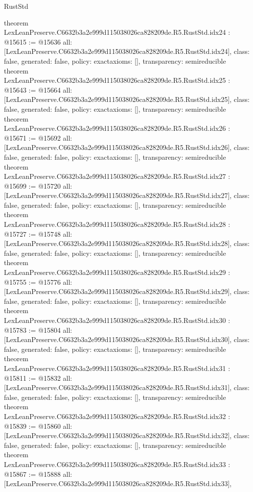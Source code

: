 \begin{lexlean}{RustStd}
\begin{coremodule}
{}
theorem LexLeanPreserve.C6632b3a2e999d115038026ca828209de.R5.RustStd.idx24 : @15615 := @15636 {
  all: [LexLeanPreserve.C6632b3a2e999d115038026ca828209de.R5.RustStd.idx24],
  class: false,
  generated: false,
  policy: exact{axioms: []},
  transparency: semireducible
}
theorem LexLeanPreserve.C6632b3a2e999d115038026ca828209de.R5.RustStd.idx25 : @15643 := @15664 {
  all: [LexLeanPreserve.C6632b3a2e999d115038026ca828209de.R5.RustStd.idx25],
  class: false,
  generated: false,
  policy: exact{axioms: []},
  transparency: semireducible
}
theorem LexLeanPreserve.C6632b3a2e999d115038026ca828209de.R5.RustStd.idx26 : @15671 := @15692 {
  all: [LexLeanPreserve.C6632b3a2e999d115038026ca828209de.R5.RustStd.idx26],
  class: false,
  generated: false,
  policy: exact{axioms: []},
  transparency: semireducible
}
theorem LexLeanPreserve.C6632b3a2e999d115038026ca828209de.R5.RustStd.idx27 : @15699 := @15720 {
  all: [LexLeanPreserve.C6632b3a2e999d115038026ca828209de.R5.RustStd.idx27],
  class: false,
  generated: false,
  policy: exact{axioms: []},
  transparency: semireducible
}
theorem LexLeanPreserve.C6632b3a2e999d115038026ca828209de.R5.RustStd.idx28 : @15727 := @15748 {
  all: [LexLeanPreserve.C6632b3a2e999d115038026ca828209de.R5.RustStd.idx28],
  class: false,
  generated: false,
  policy: exact{axioms: []},
  transparency: semireducible
}
theorem LexLeanPreserve.C6632b3a2e999d115038026ca828209de.R5.RustStd.idx29 : @15755 := @15776 {
  all: [LexLeanPreserve.C6632b3a2e999d115038026ca828209de.R5.RustStd.idx29],
  class: false,
  generated: false,
  policy: exact{axioms: []},
  transparency: semireducible
}
theorem LexLeanPreserve.C6632b3a2e999d115038026ca828209de.R5.RustStd.idx30 : @15783 := @15804 {
  all: [LexLeanPreserve.C6632b3a2e999d115038026ca828209de.R5.RustStd.idx30],
  class: false,
  generated: false,
  policy: exact{axioms: []},
  transparency: semireducible
}
theorem LexLeanPreserve.C6632b3a2e999d115038026ca828209de.R5.RustStd.idx31 : @15811 := @15832 {
  all: [LexLeanPreserve.C6632b3a2e999d115038026ca828209de.R5.RustStd.idx31],
  class: false,
  generated: false,
  policy: exact{axioms: []},
  transparency: semireducible
}
theorem LexLeanPreserve.C6632b3a2e999d115038026ca828209de.R5.RustStd.idx32 : @15839 := @15860 {
  all: [LexLeanPreserve.C6632b3a2e999d115038026ca828209de.R5.RustStd.idx32],
  class: false,
  generated: false,
  policy: exact{axioms: []},
  transparency: semireducible
}
theorem LexLeanPreserve.C6632b3a2e999d115038026ca828209de.R5.RustStd.idx33 : @15867 := @15888 {
  all: [LexLeanPreserve.C6632b3a2e999d115038026ca828209de.R5.RustStd.idx33],
}
\end{coremodule}
\end{lexlean}
